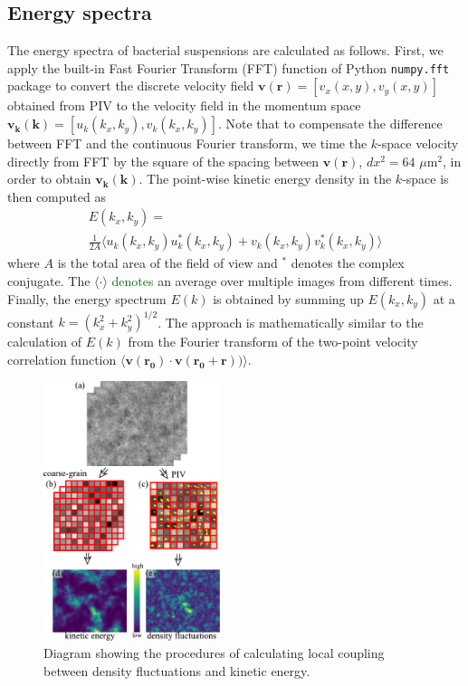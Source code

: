 \documentclass[twocolumn,aps,prx,amsmath,amssymb,longbibliography]{revtex4-2}
\begin{document}
\subsection{Energy spectra} \label{appendix-IA-ES}
The energy spectra of bacterial suspensions are calculated as follows. First, we apply the built-in Fast Fourier Transform (FFT) function of Python \texttt{numpy.fft} package to convert the discrete velocity field $\bm{v}(\bm{r}) = [v_x(x,y), v_y(x,y)]$ obtained from PIV to the velocity field in the momentum space $\bm{v_k}(\bm{k}) = [u_k(k_x,k_y),v_k(k_x,k_y)]$. Note that to compensate the difference between FFT and the continuous Fourier transform, we time the $k$-space velocity directly from FFT by the square of the spacing between $\bm{v}(\bm{r})$, $dx^2 = 64$ $\mu$m$^2$, in order to obtain $\bm{v_k}(\bm{k})$. The point-wise kinetic energy density in the $k$-space is then computed as
\begin{multline}
	E(k_x, k_y) = \\
	\frac{1}{2A}\langle u_k(k_x, k_y)u^*_k(k_x, k_y)+v_k(k_x, k_y)v_k^*(k_x, k_y)\rangle
\end{multline}
where $A$ is the total area of the field of view and $^*$ denotes the complex conjugate. The $\langle\cdot\rangle$ \textcolor{darkgreen}{denotes} an average over multiple images from different times. Finally, the energy spectrum $E(k)$ is obtained by summing up $E(k_x,k_y)$ at a constant $k=(k_x^2+k_y^2)^{1/2}$. The approach is mathematically similar to the calculation of $E(k)$ from the Fourier transform of the two-point velocity correlation function $\langle \bm{v}(\bm{r_0}) \cdot \bm{v}(\bm{r_0}+\bm{r})) \rangle$.


\begin{figure}[t]
	\begin{center}
		\includegraphics[width=0.46\textwidth]{Figures/fig-9.pdf}
		\caption[Density autocorrelation]
		{
			Diagram showing the procedures of calculating local coupling between density fluctuations and kinetic energy.
		}
		\label{fig:coupling-calculation}
	\end{center}
\end{figure}
\end{document}

